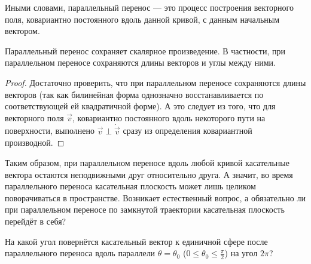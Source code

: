Иными словами, параллельный перенос --- это процесс построения векторного поля, ковариантно постоянного вдоль данной кривой, с данным начальным вектором.

\begin{lemma}
	Параллельный перенос сохраняет скалярное произведение. В частности, при параллельном переносе сохраняются длины векторов и углы между ними.
\end{lemma}

\begin{proof}
	Достаточно проверить, что при параллельном переносе сохраняются длины векторов (так как билинейная форма однозначно восстанавливается по соответствующей ей квадратичной форме). А это следует из того, что для векторного поля $\vec{v}$, ковариантно постоянного вдоль некоторого пути на поверхности, выполнено $\vec{v} \perp \dot{\vec{v}}$ сразу из определения ковариантной производной.
\end{proof}

Таким образом, при параллельном переносе вдоль любой кривой касательные вектора остаются неподвижными друг относительно друга. А значит, во время параллельного переноса касательная плоскость может лишь целиком поворачиваться в пространстве. Возникает естественный вопрос, а обязательно ли при параллельном переносе по замкнутой траектории касательная плоскость перейдёт в себя?

\begin{problem} \label{problem:SphereTranslation}
	На какой угол повернётся касательный вектор к единичной сфере после параллельного переноса вдоль параллели $\theta = \theta_0$ ($0 \leqslant \theta_0 \leqslant \frac{\pi}{2}$) на угол $2\pi$?
\end{problem}

